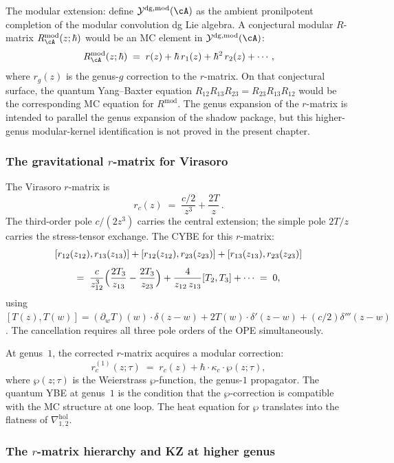 The modular extension: define $\mathcal{Y}^{\mathrm{dg,mod}}(\cA)$
as the ambient pronilpotent completion of the modular convolution
dg Lie algebra. A conjectural modular $R$-matrix
$R^{\mathrm{mod}}_\cA(z;\hbar)$ would be an MC element
in $\mathcal{Y}^{\mathrm{dg,mod}}(\cA)$:
\[
R^{\mathrm{mod}}_\cA(z;\hbar)
\;=\;
r(z)+\hbar\,r_1(z)+\hbar^2\,r_2(z)+\cdots\,,
\]
where $r_g(z)$ is the genus-$g$ correction to the $r$-matrix.
On that conjectural surface, the quantum Yang--Baxter equation
$R_{12}R_{13}R_{23}=R_{23}R_{13}R_{12}$ would be the corresponding
MC equation for $R^{\mathrm{mod}}$. The genus expansion of the
$r$-matrix is intended to parallel the genus expansion of the shadow
package, but this higher-genus modular-kernel identification is not
proved in the present chapter.

\subsubsection*{The gravitational $r$-matrix for Virasoro}

The Virasoro $r$-matrix is
\[
r_c(z)
\;=\;
\frac{c/2}{z^3}+\frac{2T}{z}\,.
\]
The third-order pole $c/(2z^3)$ carries the central extension; the
simple pole $2T/z$ carries the stress-tensor exchange. The CYBE
for this $r$-matrix:
\begin{align*}
&[r_{12}(z_{12}),r_{13}(z_{13})]
+[r_{12}(z_{12}),r_{23}(z_{23})]
+[r_{13}(z_{13}),r_{23}(z_{23})]\\[4pt]
&\qquad=\;
\frac{c}{z_{12}^3}\Bigl(\frac{2T_3}{z_{13}}
-\frac{2T_3}{z_{23}}\Bigr)
+\frac{4}{z_{12}\,z_{13}}[T_2,T_3]
+\cdots
\;=\;0,
\end{align*}
using $[T(z),T(w)]=(\partial_w T)(w)\cdot\delta(z-w)
+2T(w)\cdot\delta'(z-w)+(c/2)\delta'''(z-w)$.
The cancellation requires all three pole orders of the OPE
simultaneously.

At genus~$1$, the corrected $r$-matrix acquires a modular
correction:
\[
r_c^{(1)}(z;\tau)
\;=\;
r_c(z)+\hbar\cdot\kappa_c\cdot\wp(z;\tau),
\]
where $\wp(z;\tau)$ is the Weierstrass $\wp$-function, the
genus-$1$ propagator. The quantum YBE at genus~$1$ is the
condition that the $\wp$-correction is compatible with the MC
structure at one loop. The heat equation for $\wp$ translates
into the flatness of $\nabla^{\mathrm{hol}}_{1,2}$.

\subsubsection*{The $r$-matrix hierarchy and KZ at higher genus}

